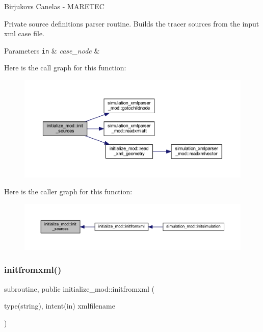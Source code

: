 Birjukovs Canelas -\/ M\+A\+R\+E\+T\+EC 

Private source definitions parser routine. Builds the tracer sources from the input xml case file. 
\begin{DoxyParams}[1]{Parameters}
\mbox{\tt in}  & {\em case\+\_\+node} & \\
\hline
\end{DoxyParams}
Here is the call graph for this function\+:
\nopagebreak
\begin{figure}[H]
\begin{center}
\leavevmode
\includegraphics[width=350pt]{namespaceinitialize__mod_aae6a35bca190cdf65a6146f254264cd1_cgraph}
\end{center}
\end{figure}
Here is the caller graph for this function\+:
\nopagebreak
\begin{figure}[H]
\begin{center}
\leavevmode
\includegraphics[width=350pt]{namespaceinitialize__mod_aae6a35bca190cdf65a6146f254264cd1_icgraph}
\end{center}
\end{figure}
\mbox{\label{namespaceinitialize__mod_a107012ffec69fe2d7c524d240193439e}} 
\subsubsection{\texorpdfstring{initfromxml()}{initfromxml()}}
{\footnotesize\ttfamily subroutine, public initialize\+\_\+mod\+::initfromxml (\begin{DoxyParamCaption}\item[{type(string), intent(in)}]{xmlfilename }\end{DoxyParamCaption})}



